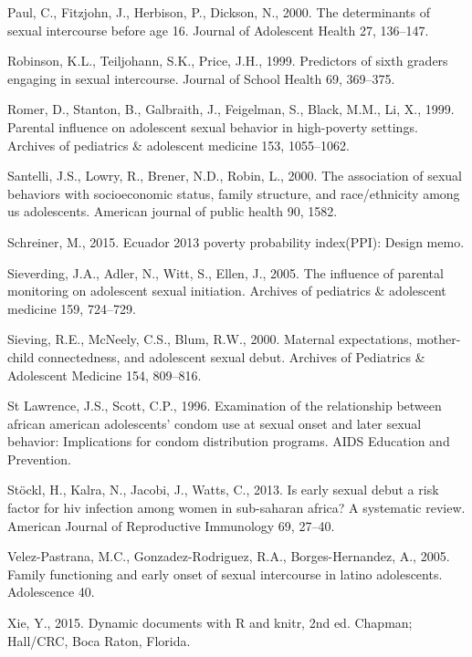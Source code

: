 \documentclass[
]{article}
\newlength{\cslhangindent}
\newenvironment{cslreferences}%
  {\setlength{\parindent}{0pt}%
  \everypar{\setlength{\hangindent}{\cslhangindent}}\ignorespaces}%
  {\par}
\begin{document}
\begin{cslreferences}
\leavevmode\hypertarget{ref-paul2000determinants}{}%
Paul, C., Fitzjohn, J., Herbison, P., Dickson, N., 2000. The
determinants of sexual intercourse before age 16. Journal of Adolescent
Health 27, 136--147.

\leavevmode\hypertarget{ref-robinson1999predictors}{}%
Robinson, K.L., Teiljohann, S.K., Price, J.H., 1999. Predictors of sixth
graders engaging in sexual intercourse. Journal of School Health 69,
369--375.

\leavevmode\hypertarget{ref-romer1999parental}{}%
Romer, D., Stanton, B., Galbraith, J., Feigelman, S., Black, M.M., Li,
X., 1999. Parental influence on adolescent sexual behavior in
high-poverty settings. Archives of pediatrics \& adolescent medicine
153, 1055--1062.

\leavevmode\hypertarget{ref-santelli2000association}{}%
Santelli, J.S., Lowry, R., Brener, N.D., Robin, L., 2000. The
association of sexual behaviors with socioeconomic status, family
structure, and race/ethnicity among us adolescents. American journal of
public health 90, 1582.

\leavevmode\hypertarget{ref-schreiner2015ecuador}{}%
Schreiner, M., 2015. Ecuador 2013 poverty probability index(PPI): Design
memo.

\leavevmode\hypertarget{ref-sieverding2005influence}{}%
Sieverding, J.A., Adler, N., Witt, S., Ellen, J., 2005. The influence of
parental monitoring on adolescent sexual initiation. Archives of
pediatrics \& adolescent medicine 159, 724--729.

\leavevmode\hypertarget{ref-sieving2000maternal}{}%
Sieving, R.E., McNeely, C.S., Blum, R.W., 2000. Maternal expectations,
mother-child connectedness, and adolescent sexual debut. Archives of
Pediatrics \& Adolescent Medicine 154, 809--816.

\leavevmode\hypertarget{ref-st1996examination}{}%
St Lawrence, J.S., Scott, C.P., 1996. Examination of the relationship
between african american adolescents' condom use at sexual onset and
later sexual behavior: Implications for condom distribution programs.
AIDS Education and Prevention.

\leavevmode\hypertarget{ref-stockl2013early}{}%
Stöckl, H., Kalra, N., Jacobi, J., Watts, C., 2013. Is early sexual
debut a risk factor for hiv infection among women in sub-saharan africa?
A systematic review. American Journal of Reproductive Immunology 69,
27--40.

\leavevmode\hypertarget{ref-velez2005family}{}%
Velez-Pastrana, M.C., Gonzadez-Rodriguez, R.A., Borges-Hernandez, A.,
2005. Family functioning and early onset of sexual intercourse in latino
adolescents. Adolescence 40.

\leavevmode\hypertarget{ref-knitr2015}{}%
Xie, Y., 2015. Dynamic documents with R and knitr, 2nd ed. Chapman;
Hall/CRC, Boca Raton, Florida.
\end{cslreferences}
\end{document}
